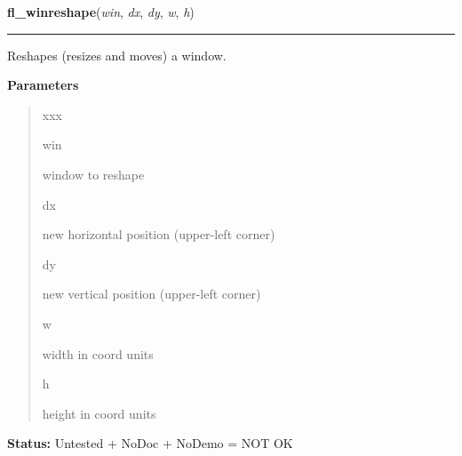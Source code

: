 \hspace{.8\funcindent}\begin{boxedminipage}{\funcwidth}

    \raggedright \textbf{fl\_winreshape}(\textit{win}, \textit{dx}, \textit{dy}, \textit{w}, \textit{h})

    \vspace{-1.5ex}

    \rule{\textwidth}{0.5\fboxrule}
\setlength{\parskip}{2ex}
    Reshapes (resizes and moves) a window.

\setlength{\parskip}{1ex}
      \textbf{Parameters}
      \vspace{-1ex}

      \begin{quote}
        \begin{Ventry}{xxx}

          \item[win]

          window to reshape

          \item[dx]

          new horizontal position (upper-left corner)

          \item[dy]

          new vertical position (upper-left corner)

          \item[w]

          width in coord units

          \item[h]

          height in coord units

        \end{Ventry}

      \end{quote}

\textbf{Status:} Untested + NoDoc + NoDemo = NOT OK



    \end{boxedminipage}

    \label{xformslib:library:fl_winicon}

    \vspace{0.5ex}

